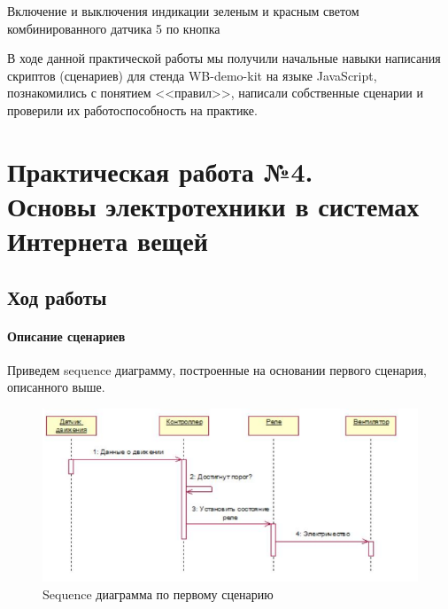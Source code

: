 \documentclass[a4paper,14pt]{extarticle}
\begin{document}
\script Включение и выключения индикации зеленым и красным светом комбинированного датчика 5 по кнопка

В ходе данной практической работы мы получили начальные навыки написания скриптов (сценариев) для стенда WB-demo-kit  на языке JavaScript, познакомились с понятием <<правил>>, написали собственные сценарии и проверили их работоспособность на практике. 

\newpage

\section{Практическая работа №4. \\Основы электротехники в системах\\Интернета вещей}
\subsection{Ход работы}
\paragraph{Описание сценариев} Приведем sequence диаграмму, построенные на основании первого сценария, описанного выше.
\begin{figure}[htbp]
	\centering
	\includegraphics[width=0.7\linewidth]{images/deploy-scheme}
	\caption{Sequence диаграмма по первому сценарию}
	\label{fig:deploy-scheme}
\end{figure}
\end{document}
